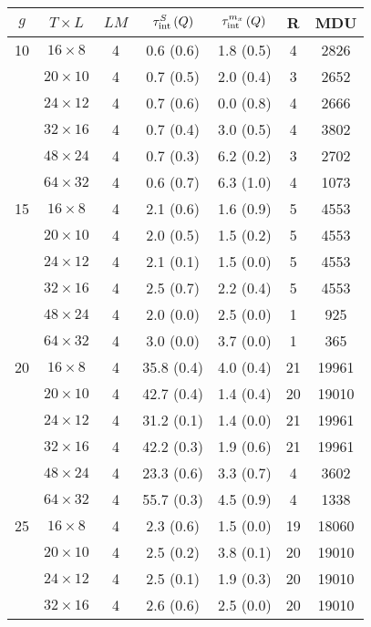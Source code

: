 \begin{longtable}{ccccccc}
\toprule
$g$ & $T\times L$ & $LM$ & $\tau_{\rm int}^{S}\,(Q)$ & $\tau_{\rm int}^{m_x}\,(Q)$ & R & MDU \\
\midrule
 10 & $16 \times   8$ &  4 & 0.6 \; (0.6) & 1.8 \; (0.5) & 4 & 2826 \\
    & $20 \times  10$ &  4 & 0.7 \; (0.5) & 2.0 \; (0.4) & 3 & 2652 \\
    & $24 \times  12$ &  4 & 0.7 \; (0.6) & 0.0 \; (0.8) & 4 & 2666 \\
    & $32 \times  16$ &  4 & 0.7 \; (0.4) & 3.0 \; (0.5) & 4 & 3802 \\
    & $48 \times  24$ &  4 & 0.7 \; (0.3) & 6.2 \; (0.2) & 3 & 2702 \\
    & $64 \times  32$ &  4 & 0.6 \; (0.7) & 6.3 \; (1.0) & 4 & 1073 \\
\midrule
 15 & $16 \times   8$ &  4 & 2.1 \; (0.6) & 1.6 \; (0.9) & 5 & 4553 \\
    & $20 \times  10$ &  4 & 2.0 \; (0.5) & 1.5 \; (0.2) & 5 & 4553 \\
    & $24 \times  12$ &  4 & 2.1 \; (0.1) & 1.5 \; (0.0) & 5 & 4553 \\
    & $32 \times  16$ &  4 & 2.5 \; (0.7) & 2.2 \; (0.4) & 5 & 4553 \\
    & $48 \times  24$ &  4 & 2.0 \; (0.0) & 2.5 \; (0.0) & 1 & 925 \\
    & $64 \times  32$ &  4 & 3.0 \; (0.0) & 3.7 \; (0.0) & 1 & 365 \\
\midrule
 20 & $16 \times   8$ &  4 & 35.8 \; (0.4) & 4.0 \; (0.4) & 21 & 19961 \\
    & $20 \times  10$ &  4 & 42.7 \; (0.4) & 1.4 \; (0.4) & 20 & 19010 \\
    & $24 \times  12$ &  4 & 31.2 \; (0.1) & 1.4 \; (0.0) & 21 & 19961 \\
    & $32 \times  16$ &  4 & 42.2 \; (0.3) & 1.9 \; (0.6) & 21 & 19961 \\
    & $48 \times  24$ &  4 & 23.3 \; (0.6) & 3.3 \; (0.7) & 4 & 3602 \\
    & $64 \times  32$ &  4 & 55.7 \; (0.3) & 4.5 \; (0.9) & 4 & 1338 \\
\midrule
 25 & $16 \times   8$ &  4 & 2.3 \; (0.6) & 1.5 \; (0.0) & 19 & 18060 \\
    & $20 \times  10$ &  4 & 2.5 \; (0.2) & 3.8 \; (0.1) & 20 & 19010 \\
    & $24 \times  12$ &  4 & 2.5 \; (0.1) & 1.9 \; (0.3) & 20 & 19010 \\
    & $32 \times  16$ &  4 & 2.6 \; (0.6) & 2.5 \; (0.0) & 20 & 19010 \\

\end{longtable}
